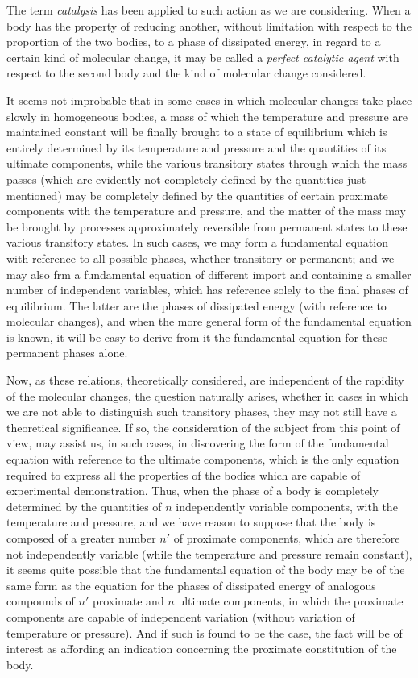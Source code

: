 \documentclass[12pt]{article}
\begin{document}
The term \textit{catalysis} has been applied to such action as we are considering.  When a body has the property of reducing another, without limitation with respect to the proportion of the two bodies, to a phase of dissipated energy, in regard to a certain kind of molecular change, it may be called a \textit{perfect catalytic agent} with respect to the second body and the kind of molecular change considered.


It seems not improbable that in some cases in which molecular changes take place slowly in homogeneous bodies, a mass of which the temperature and pressure are maintained constant will be finally brought to a state of equilibrium which is entirely determined by its temperature and pressure and the quantities of its ultimate components, while the various transitory states through which the mass passes (which are evidently not completely defined by the quantities just mentioned) may be completely defined by the quantities of certain proximate components with the temperature and pressure, and the matter of the mass may be brought by processes approximately reversible from permanent states to these various transitory states. In such cases, we may form a fundamental equation with reference to all possible phases, whether transitory or permanent; and we may also frm a fundamental equation of different import and containing a smaller number of independent variables, which has reference solely to the final phases of equilibrium. The latter are the phases of dissipated energy (with reference to molecular changes), and when the more general form of the fundamental equation is known, it will be easy to derive from it the fundamental equation for these permanent phases alone.


Now, as these relations, theoretically considered, are independent of the rapidity of the molecular changes, the question naturally arises, whether in cases in which we are not able to distinguish such transitory phases, they may not still have a theoretical significance. If so, the consideration of the subject from this point of view, may assist us, in such cases, in discovering the form of the fundamental equation with reference to the ultimate components, which is the only equation required to express all the properties of the bodies which are capable of experimental demonstration. Thus, when the phase of a body is completely determined by the quantities of $n$ independently variable components, with the temperature and pressure, and we have reason to suppose that the body is composed of a greater number $n'$ of proximate components, which are therefore not independently variable (while the temperature and pressure remain constant), it seems quite possible that the fundamental equation of the body may be of the same form as the equation for the phases of dissipated energy of analogous compounds of $n'$ proximate and $n$ ultimate components, in which the proximate components are capable of independent variation (without variation of temperature or pressure). And if such is found to be the case, the fact will be of interest as affording an indication concerning the proximate constitution of the body.
\end{document}
